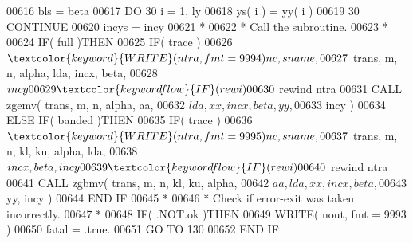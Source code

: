 \begin{DoxyCode}
00616                               bls = beta
00617                               \textcolor{keywordflow}{DO} 30 i = 1, ly
00618                                  ys( i ) = yy( i )
00619    30                         \textcolor{keywordflow}{CONTINUE}
00620                               incys = incy
00621 \textcolor{comment}{*}
00622 \textcolor{comment}{*                             Call the subroutine.}
00623 \textcolor{comment}{*}
00624                               \textcolor{keywordflow}{IF}( full )\textcolor{keywordflow}{THEN}
00625                                  \textcolor{keywordflow}{IF}( trace )
00626      $                              \textcolor{keyword}{WRITE}( ntra, fmt = 9994 )nc, sname,
00627      $                              trans, m, n, alpha, lda, incx, beta,
00628      $                              incy
00629                                  \textcolor{keywordflow}{IF}( rewi )
00630      $                              rewind ntra
00631                                  \textcolor{keyword}{CALL }zgemv( trans, m, n, alpha, aa,
00632      $                                       lda, xx, incx, beta, yy,
00633      $                                       incy )
00634                               \textcolor{keywordflow}{ELSE} \textcolor{keywordflow}{IF}( banded )\textcolor{keywordflow}{THEN}
00635                                  \textcolor{keywordflow}{IF}( trace )
00636      $                              \textcolor{keyword}{WRITE}( ntra, fmt = 9995 )nc, sname,
00637      $                              trans, m, n, kl, ku, alpha, lda,
00638      $                              incx, beta, incy
00639                                  \textcolor{keywordflow}{IF}( rewi )
00640      $                              rewind ntra
00641                                  \textcolor{keyword}{CALL }zgbmv( trans, m, n, kl, ku, alpha,
00642      $                                       aa, lda, xx, incx, beta,
00643      $                                       yy, incy )
00644 \textcolor{keywordflow}{                              END IF}
00645 \textcolor{comment}{*}
00646 \textcolor{comment}{*                             Check if error-exit was taken incorrectly.}
00647 \textcolor{comment}{*}
00648                               \textcolor{keywordflow}{IF}( .NOT.ok )\textcolor{keywordflow}{THEN}
00649                                  \textcolor{keyword}{WRITE}( nout, fmt = 9993 )
00650                                  fatal = .true.
00651                                  \textcolor{keywordflow}{GO TO} 130
00652 \textcolor{keywordflow}{                              END IF}

\end{DoxyCode}
